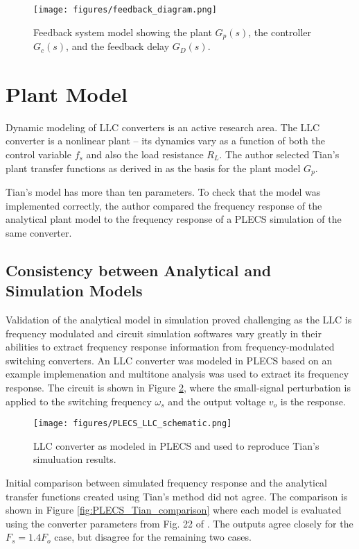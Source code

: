 \documentclass[journal]{IEEEtran}
\begin{document}
\begin{figure}[H]
  \centering
  \texttt{[image: figures/feedback\_diagram.png]}
  \caption{Feedback system model showing the plant $G_p(s)$, the controller $G_c(s)$, and the feedback delay $G_D(s)$.}
  \label{fig:feedback_diagram}
\end{figure}


\section{Plant Model}

Dynamic modeling of LLC converters is an active research area. 
The LLC converter is a nonlinear plant -- its dynamics vary as a function of both the control variable $f_s$ and also the load resistance $R_L$. 
The author selected Tian's plant transfer functions as derived in \cite{tian_equivalent_2020} as the basis for the plant model $G_p$. 

Tian's model has more than ten parameters. 
To check that the model was implemented correctly, the author compared the frequency response of the analytical plant model to the frequency response of a PLECS simulation of the same converter.

\subsection{Consistency between Analytical and Simulation Models}

Validation of the analytical model in simulation proved challenging as the LLC is frequency modulated and circuit simulation softwares vary greatly in their abilities to extract frequency response information from frequency-modulated switching converters.
An LLC converter was modeled in PLECS based on an example implemenation and multitone analysis \cite{plecs_analysis_2022} was used to extract its frequency response. 
The circuit is shown in Figure \ref{fig:PLECS_LLC}, where the small-signal perturbation is applied to the switching frequency $\omega_s$ and the output voltage $v_{o}$ is the response.

\begin{figure}
  \centering
  \texttt{[image: figures/PLECS\_LLC\_schematic.png]}
  \caption{LLC converter as modeled in PLECS and used to reproduce Tian's simuluation results.}
  \label{fig:PLECS_LLC}
\end{figure}

Initial comparison between simulated frequency response and the analytical transfer functions created using Tian's method did not agree. The comparison is shown in Figure \ref{fig:PLECS_Tian_comparison} where each model is evaluated using the converter parameters from Fig. 22 of \cite{tian_equivalent_2020}. The outputs agree closely for the $F_s = 1.4 F_o$ case, but disagree for the remaining two cases.
\end{document}
